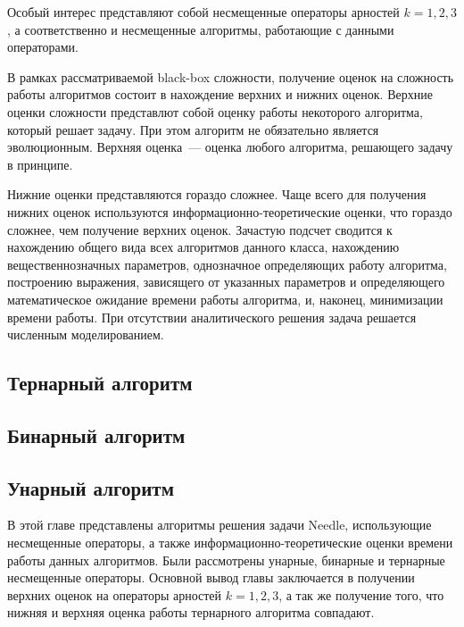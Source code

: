 Особый интерес представляют собой несмещенные операторы арностей $k = 1, 2, 3$, а соответственно и несмещенные алгоритмы, работающие с данными операторами.

В рамках рассматриваемой black-box сложности, получение оценок на сложность работы алгоритмов состоит в нахождение верхних и нижних оценок. 
Верхние оценки сложности представлют собой оценку работы некоторого алгоритма, который решает задачу. При этом алгоритм не обязательно является эволюционным. 
Верхняя оценка~--- оценка любого алгоритма, решающего задачу в принципе. 

Нижние оценки представляются гораздо сложнее. Чаще всего для получения нижних оценок используются информационно-теоретические оценки, что гораздо сложнее, чем получение верхних оценок. 
Зачастую подсчет сводится к нахождению общего вида всех алгоритмов данного класса, нахождению вещественнозначных параметров, однозначное определяющих работу алгоритма, построению выражения, 
зависящего от указанных параметров и определяющего математическое ожидание времени работы алгоритма, и, наконец, минимизации времени работы. При отсутствии аналитического решения задача 
решается численным моделированием.   

\subsection{Тернарный алгоритм}


\subsection{Бинарный алгоритм}


\subsection{Унарный алгоритм}


\chapterconclusion

В этой главе представлены алгоритмы решения задачи Needle, использующие несмещенные операторы, а также информационно-теоретические оценки времени работы данных алгоритмов. Были рассмотрены 
унарные, бинарные и тернарные несмещенные операторы. Основной вывод главы заключается в получении верхних оценок на операторы арностей $k = 1, 2, 3$, а так же получение того, что нижняя и верхняя оценка 
работы тернарного алгоритма совпадают.
